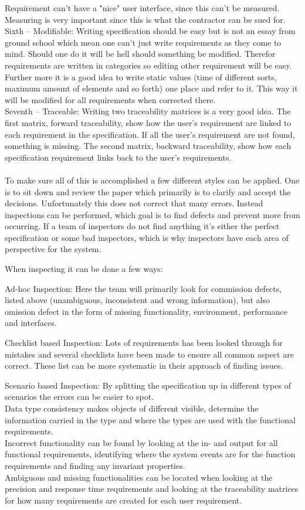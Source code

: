 \documentclass[Main]{subfiles}
\begin{document}
Requirement can't have a "nice" user interface, since this can't be measured.
Measuring is very important since this is what the contractor can be sued for.
\\
Sixth -- Modifiable:
Writing specification should be easy but is not an essay from ground school which mean one can't just write requirements as they come to mind.
Should one do it will be hell should something be modified.
Therefor requirements are written in categories so editing other requirement will be easy.
Further more it is a good idea to write static values (time of different sorts, maximum amount of elements and so forth) one place and refer to it.
This way it will be modified for all requirements when corrected there.
\\
Seventh -- Traceable:
Writing two traceability matrices is a very good idea.
The first matrix, forward traceability, show how the user's requirement are linked to each requirement in the specification.
If all the user's requirement are not found, something is missing.
The second matrix, backward traceability, show how each specification requirement links back to the user's requirements.
\\
\\
To make sure all of this is accomplished a few different styles can be applied.
One is to sit down and review the paper which primarily is to clarify and accept the decisions.
Unfortunately this does not correct that many errors. 
Instead inspections can be performed, which goal is to find defects and prevent more from occurring.
If a team of inspectors do not find anything it's either the perfect specification or some bad inspectors, which is why inspectors have each area of perspective for the system. 

When inspecting it can be done a few ways:


Ad-hoc Inspection:
Here the team will primarily look for commission defects, listed above (unambiguous, inconsistent and wrong information), but also omission defect in the form of missing functionality, environment, performance and interfaces.


Checklist based Inspection:
Lots of requirements has been looked through for mistakes and several checklists have been made to ensure all common aspect are correct. 
These list can be more systematic in their approach of finding issues.


Scenario based Inspection:
By splitting the specification up in different types of scenarios the errors can be easier to spot.
\\
Data type consistency makes objects of different visible, determine the information carried in the type and where the types are used with the functional requirements.
\\
Incorrect functionality can be found by looking at the in- and output for all functional requirements, identifying where the system events are for the function requirements and finding any invariant properties.
\\
Ambiguous and missing functionalities can be located when looking at the precision and response time requirements and looking at the traceability matrices for how many requirements are created for each user requirement.
\end{document}
